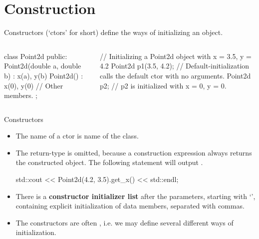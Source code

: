 \documentclass{beamer}
\begin{document}
\section{Construction}

\begin{frame}[fragile]{Constructors}
     (`ctors' for short) define the ways of initializing an object.
    \begin{columns}
        \begin{column}{0.5\linewidth}
            \begin{cpp}
class Point2d {
 public:
  Point2d(double a, double b)
    : x(a), y(b) {}
  Point2d() : x(0), y(0) {}
  // Other members.
};
            \end{cpp}
        \end{column}
        \begin{column}{0.5\linewidth}
            \begin{cpp}
// Initializing a Point2d object with x = 3.5, y = 4.2
Point2d p1(3.5, 4.2);
// Default-initialization calls the default ctor with no arguments.
Point2d p2;
// p2 is initialized with x = 0, y = 0.
            \end{cpp}
        \end{column}
    \end{columns}
\end{frame}

\begin{frame}[fragile]{Constructors}
    \begin{itemize}
        \item The name of a ctor is name of the class.
        \item The return-type is omitted, because a construction expression always returns the constructed object. The following statement will output .
        \begin{cpp}
std::cout << Point2d(4.2, 3.5).get_x() << std::endl;
        \end{cpp}
        \item There is a \textbf{constructor initializer list} after the parameters, starting with `\ttt{:}', containing explicit initialization of  data members, separated with commas.
        \item The constructors are often , i.e. we may define several different ways of initialization.
    \end{itemize}
\end{frame}
\end{document}
